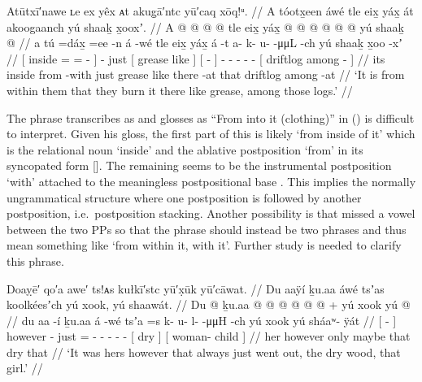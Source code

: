 \ex\label{ex:89-27-like-grease-burn-it}%
%
\begingl
	\glpreamble	Atūtxī′nawe ʟe ex yêx ᴀt akug̣ā′ntc yū′caq xōq!ᵘ. //
	\glpreamble	A tóotx̱een áwé tle eix̱ yáx̱ át akoogaanch yú shaaḵ x̱ooxʼ. //
	\gla	{} A  @ {} @ {} @ {} {}
		 @ {}
		tle {} eix̱ yáx̱ {}
		{}  @ {} {}
		 @ {} @ {} @ {} @ {} @ {}
		{} yú shaaḵ  @ {} {} //
	\glb	{} a tú =dáx̱ =ee -n {}
		á -wé
		tle {} eix̱ yáx̱ {}
		{} á -t {}
		a- k- u-  -μμL -ch
		{} yú shaaḵ x̱oo -xʼ {} //
	\glc	{}[  inside = = - {}]
		 -
		just {}[ grease like {}]
		{}[  - {}]
		- - -  - -
		{}[  driftlog among - {}] //
	\gld	{} its inside \•from {} -with {}
		 {}
		just {} grease like {}
		{} there -at {}
		 {} {} {} {} {}
		{} that driftlog among -at {} //
	\glft	‘It is from within them that they burn it there like grease, among those logs.’
		//
\endgl
\xe

The phrase \citeauthor{swanton:1909} transcribes as  and glosses as “From into it (clothing)” in (\lastx) is difficult to interpret.
Given his gloss, the first part of this is likely  ‘from inside of it’ which is the relational noun  ‘inside’ and the ablative postposition  ‘from’ in its syncopated form  [].
The remaining  seems to be the instrumental postposition  ‘with’ attached to the meaningless postpositional base .
This implies the normally ungrammatical structure where one postposition is followed by another postposition, i.e.\ postposition stacking.
Another possibility is that \citeauthor{swanton:1909} missed a vowel between the two PPs so that the phrase should instead be two phrases  and thus mean something like ‘from within it, with it’.
Further study is needed to clarify this phrase.

\ex\label{ex:89-28-dry-went-out}%
%
\begingl
	\glpreamble	Doaỵē′ qo′a awe′ ts!ᴀs kułkī′stc yū′x̣ūk yū′cāwat. //
	\glpreamble	Du aaÿí ḵu.aa áwé tsʼas koolkéesʼch yú xook, yú shaawát. //
	\gla	{} Du  @ {} {} ḵu.aa  {}
		 @ {}
		 @ {} @ {} @ {} @ {} @ {} +
		{} yú xook {}
		{} yú  @ {} {} //
	\glb	{} du aa -í {} ḵu.aa á -wé
		tsʼa =s
		k- u- l-  -μμH -ch
		{} yú xook {}
		{} yú sháaʷ- ÿát {} //
	\glc	{}[   - {}] however  -
		just =
		- - -  - -
		{}[  dry {}]
		{}[  woman- child {}] //
	\gld	{} her  {} {} however  {}
		only \•maybe
		 {} {} {} {} {}
		{} that dry {} 
		{} that  {} {} //
	\glft	‘It was hers however that always just went out, the dry wood, that girl.’
		//
\endgl
\xe


